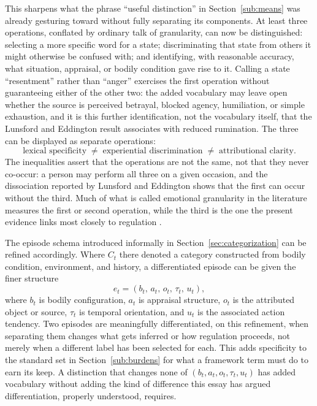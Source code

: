 \documentclass[11pt]{article}
\begin{document}
This sharpens what the phrase ``useful distinction'' in Section~\ref{sub:means} was already gesturing toward without fully separating its components. At least three operations, conflated by ordinary talk of granularity, can now be distinguished: selecting a more specific word for a state; discriminating that state from others it might otherwise be confused with; and identifying, with reasonable accuracy, what situation, appraisal, or bodily condition gave rise to it. Calling a state ``resentment'' rather than ``anger'' exercises the first operation without guaranteeing either of the other two: the added vocabulary may leave open whether the source is perceived betrayal, blocked agency, humiliation, or simple exhaustion, and it is this further identification, not the vocabulary itself, that the Lunsford and Eddington result associates with reduced rumination. The three can be displayed as separate operations:
\[
\text{lexical specificity}
\;\neq\;
\text{experiential discrimination}
\;\neq\;
\text{attributional clarity}.
\]
The inequalities assert that the operations are not the same, not that they never co-occur: a person may perform all three on a given occasion, and the dissociation reported by Lunsford and Eddington shows that the first can occur without the third. Much of what is called emotional granularity in the literature measures the first or second operation, while the third is the one the present evidence links most closely to regulation \citep{LunsfordEddington2026}.

The episode schema introduced informally in Section~\ref{sec:categorization} can be refined accordingly. Where $C_t$ there denoted a category constructed from bodily condition, environment, and history, a differentiated episode can be given the finer structure
\[
e_t = (b_t,\, a_t,\, o_t,\, \tau_t,\, u_t),
\]
where $b_t$ is bodily configuration, $a_t$ is appraisal structure, $o_t$ is the attributed object or source, $\tau_t$ is temporal orientation, and $u_t$ is the associated action tendency. Two episodes are meaningfully differentiated, on this refinement, when separating them changes what gets inferred or how regulation proceeds, not merely when a different label has been selected for each. This adds specificity to the standard set in Section~\ref{sub:burdens} for what a framework term must do to earn its keep. A distinction that changes none of $(b_t, a_t, o_t, \tau_t, u_t)$ has added vocabulary without adding the kind of difference this essay has argued differentiation, properly understood, requires.
\end{document}
